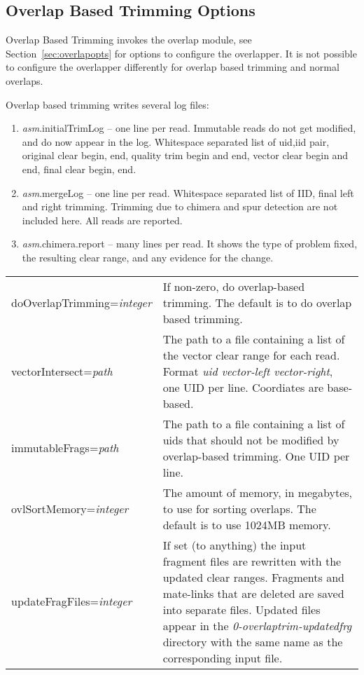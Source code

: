 \documentclass[twoside,11pt]{article}
\begin{document}
\subsection{Overlap Based Trimming Options}
\label{sec:obtopts}

Overlap Based Trimming invokes the overlap module, see
Section~\ref{sec:overlapopts} for options to configure the overlapper.
It is not possible to configure the overlapper differently for overlap
based trimming and normal overlaps.

Overlap based trimming writes several log files:

\begin{enumerate}
\item {\it asm}.initialTrimLog -- one line per read.  Immutable reads do not
get modified, and do now appear in the log.  Whitespace separated list
of uid,iid pair, original clear begin, end, quality trim begin and
end, vector clear begin and end, final clear begin, end.

\item {\it asm}.mergeLog -- one line per read.  Whitespace separated list of
IID, final left and right trimming.  Trimming due to chimera and spur
detection are not included here.  All reads are reported.

\item {\it asm}.chimera.report -- many lines per read.  It shows the type of
problem fixed, the resulting clear range, and any evidence for the
change.
\end{enumerate}


\begin{longtable}{lp{3.0in}}
doOverlapTrimming={\it integer} &
If non-zero, do overlap-based trimming.  The default is to do overlap
based trimming.
\\

vectorIntersect={\it path} &
The path to a file containing a list of the vector clear range for
each read.  Format {\it uid vector-left vector-right}, one UID per
line.  Coordiates are base-based.
\\

immutableFrags={\it path} &
The path to a file containing a list of uids that should not be
modified by overlap-based trimming.  One UID per line.
\\

ovlSortMemory={\it integer} &
The amount of memory, in megabytes, to use for sorting overlaps.  The
default is to use 1024MB memory.
\\

updateFragFiles={\it integer} &
If set (to anything) the input fragment files are rewritten with the
updated clear ranges.  Fragments and mate-links that are deleted are
saved into separate files.  Updated files appear in the {\it
0-overlaptrim-updatedfrg} directory with the same name as the
corresponding input file.
\\
\end{longtable}
\end{document}
